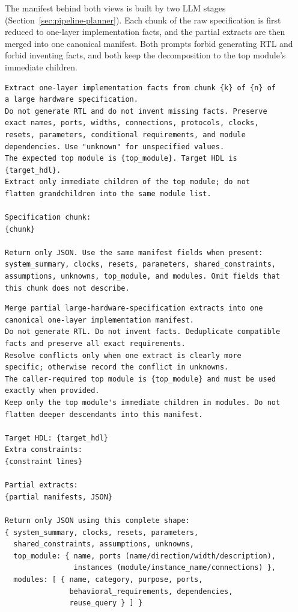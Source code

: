 The manifest behind both views is built by two LLM stages
(Section~\ref{sec:pipeline-planner}). Each chunk of the raw
specification is first reduced to one-layer implementation facts, and
the partial extracts are then merged into one canonical manifest. Both
prompts forbid generating RTL and forbid inventing facts, and both keep
the decomposition to the top module's immediate children.

\begin{lstlisting}[language={},caption={Chunk-partition
prompt.},label={lst:condense-chunk}]
Extract one-layer implementation facts from chunk {k} of {n} of
a large hardware specification.
Do not generate RTL and do not invent missing facts. Preserve
exact names, ports, widths, connections, protocols, clocks,
resets, parameters, conditional requirements, and module
dependencies. Use "unknown" for unspecified values.
The expected top module is {top_module}. Target HDL is
{target_hdl}.
Extract only immediate children of the top module; do not
flatten grandchildren into the same module list.

Specification chunk:
{chunk}

Return only JSON. Use the same manifest fields when present:
system_summary, clocks, resets, parameters, shared_constraints,
assumptions, unknowns, top_module, and modules. Omit fields that
this chunk does not describe.
\end{lstlisting}

\begin{lstlisting}[language={},caption={Manifest-merge prompt (the
required JSON shape is abridged).},label={lst:condense-merge}]
Merge partial large-hardware-specification extracts into one
canonical one-layer implementation manifest.
Do not generate RTL. Do not invent facts. Deduplicate compatible
facts and preserve all exact requirements.
Resolve conflicts only when one extract is clearly more
specific; otherwise record the conflict in unknowns.
The caller-required top module is {top_module} and must be used
exactly when provided.
Keep only the top module's immediate children in modules. Do not
flatten deeper descendants into this manifest.

Target HDL: {target_hdl}
Extra constraints:
{constraint lines}

Partial extracts:
{partial manifests, JSON}

Return only JSON using this complete shape:
{ system_summary, clocks, resets, parameters,
  shared_constraints, assumptions, unknowns,
  top_module: { name, ports (name/direction/width/description),
                instances (module/instance_name/connections) },
  modules: [ { name, category, purpose, ports,
               behavioral_requirements, dependencies,
               reuse_query } ] }
\end{lstlisting}

